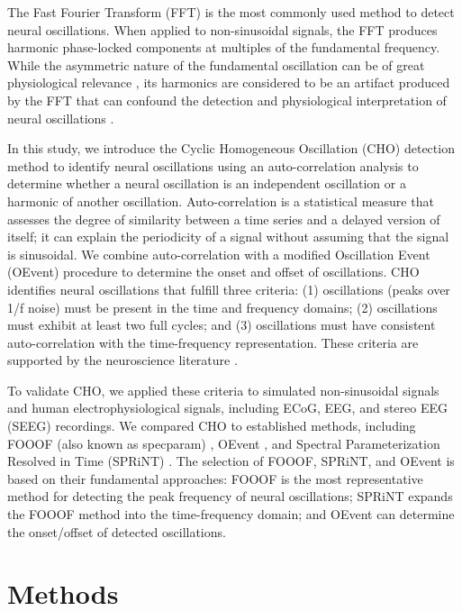 \documentclass[11pt]{article}
\begin{document}
The Fast Fourier Transform (FFT) is the most commonly used method to detect neural oscillations. When applied to non-sinusoidal signals, the FFT produces harmonic phase-locked components at multiples of the fundamental frequency. While the asymmetric nature of the fundamental oscillation can be of great physiological relevance \citep{mazaheri2008,cole2017,donoghue2022}, its harmonics are considered to be an artifact produced by the FFT that can confound the detection and physiological interpretation of neural oscillations \citep{belluscio2012,donoghue2022}.

In this study, we introduce the Cyclic Homogeneous Oscillation (CHO) detection method to identify neural oscillations using an auto-correlation analysis to determine whether a neural oscillation is an independent oscillation or a harmonic of another oscillation. Auto-correlation is a statistical measure that assesses the degree of similarity between a time series and a delayed version of itself; it can explain the periodicity of a signal without assuming that the signal is sinusoidal. We combine auto-correlation with a modified Oscillation Event (OEvent) procedure \citep{neymotin2022} to determine the onset and offset of oscillations. CHO identifies neural oscillations that fulfill three criteria: (1) oscillations (peaks over 1/f noise) must be present in the time and frequency domains; (2) oscillations must exhibit at least two full cycles; and (3) oscillations must have consistent auto-correlation with the time-frequency representation. These criteria are supported by the neuroscience literature \citep{buzsaki2004,niedermeyer2005,buzsaki2006,cohen2014,decheveigne2019,donoghue2020,donoghue2022}.

To validate CHO, we applied these criteria to simulated non-sinusoidal signals and human electrophysiological signals, including ECoG, EEG, and stereo EEG (SEEG) recordings. We compared CHO to established methods, including FOOOF (also known as specparam) \citep{donoghue2020}, OEvent \citep{neymotin2022}, and Spectral Parameterization Resolved in Time (SPRiNT) \citep{wilson2022}. The selection of FOOOF, SPRiNT, and OEvent is based on their fundamental approaches: FOOOF is the most representative method for detecting the peak frequency of neural oscillations; SPRiNT expands the FOOOF method into the time-frequency domain; and OEvent can determine the onset/offset of detected oscillations.

\section{Methods}
\end{document}
